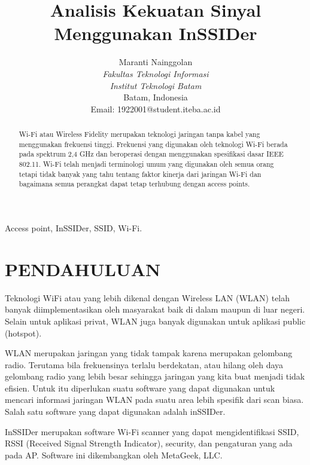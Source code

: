 \documentclass[conference]{IEEEtran}
\title{Analisis Kekuatan Sinyal Menggunakan InSSIDer}
\author{Maranti Nainggolan\\
\textit{Fakultas Teknologi Informasi}\\
\textit{Institut Teknologi Batam}\\
Batam, Indonesia\\
Email: {1922001@student.iteba.ac.id}
}
\begin{document}
\maketitle

\begin{abstract}
Wi-Fi atau Wireless Fidelity merupakan teknologi jaringan tanpa kabel yang menggunakan frekuensi tinggi. Frekuensi yang digunakan oleh teknologi Wi-Fi berada pada spektrum 2,4 GHz dan beroperasi dengan menggunakan spesifikasi dasar IEEE 802.11. Wi-Fi telah menjadi terminologi umum yang digunakan oleh semua orang tetapi tidak banyak yang tahu tentang faktor kinerja dari jaringan Wi-Fi dan bagaimana semua perangkat dapat tetap terhubung dengan access points.
\end{abstract}

\begin{IEEEkeywords}
Access point, InSSIDer, SSID, Wi-Fi.
\end{IEEEkeywords}

\section{PENDAHULUAN}
\vspace{0.3cm}

Teknologi WiFi atau yang lebih dikenal dengan Wireless LAN (WLAN) telah banyak diimplementasikan oleh masyarakat baik di dalam maupun di luar negeri. Selain untuk aplikasi privat,  WLAN juga banyak digunakan untuk aplikasi public (hotspot).

\vspace{0.4cm}

WLAN merupakan jaringan yang tidak tampak karena merupakan gelombang radio. Terutama bila frekuensinya terlalu berdekatan, atau hilang oleh daya gelombang radio yang lebih besar sehingga jaringan yang kita buat menjadi tidak efisien. Untuk itu diperlukan suatu software yang dapat digunakan untuk mencari informasi jaringan WLAN pada suatu area lebih spesifik dari scan biasa. Salah satu software yang dapat digunakan adalah inSSIDer.

\vspace{0.4cm}

InSSIDer merupakan software Wi-Fi scanner yang dapat mengidentifikasi SSID, RSSI (Received Signal Strength Indicator), security, dan pengaturan yang ada pada AP. Software ini dikembangkan oleh MetaGeek, LLC.
\end{document}

